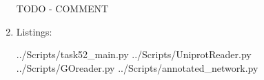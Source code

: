 \documentclass[10pt,a4paper]{article}
\begin{document}
\begin{enumerate}
	
	TODO - COMMENT
	
	\newpage
	\item Listings:
	
	 {../Scripts/task52\string_main.py}
	\newpage
	 {../Scripts/UniprotReader.py}
	\newpage
	 {../Scripts/GOreader.py}
	\newpage
	 {../Scripts/annotated\string_network.py}
	
	
	
	
\end{enumerate}
\end{document}
